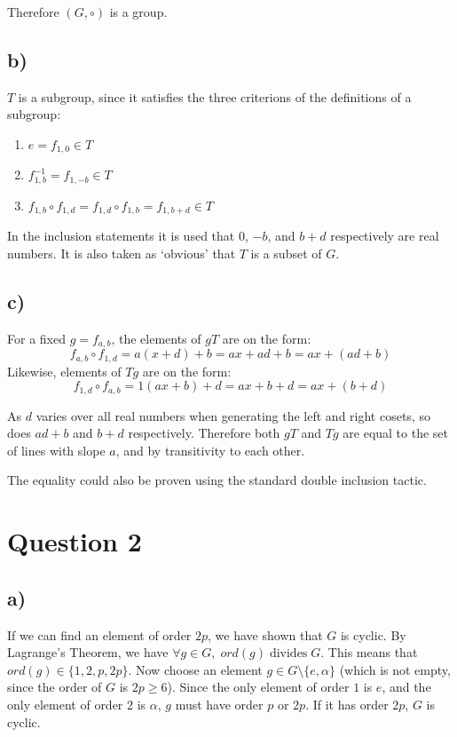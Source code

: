 \documentclass[a4paper,12pt]{article}
\begin{document}
Therefore $(G, \circ)$ is a group.

\subsection*{b)}

$T$ is a subgroup, since it satisfies the three criterions of the definitions of a subgroup:

\begin{enumerate}
    \item $e = f_{1, 0} \in T$
    \item $f_{1, b}^{-1} = f_{1, -b} \in T$
    \item $f_{1, b} \circ f_{1, d} = f_{1, d} \circ f_{1, b} = f_{1, b + d} \in T$
\end{enumerate}
In the inclusion statements it is used that $0$, $-b$, and $b + d$ respectively are real numbers. It is also taken as `obvious' that $T$ is a subset of $G$.

\subsection*{c)}
For a fixed $g = f_{a, b}$, the elements of $gT$ are on the form:
$$
f_{a, b} \circ f_{1, d} = a(x + d) + b = ax + ad + b = ax + (ad + b)
$$
Likewise, elements of $Tg$ are on the form:
$$
f_{1, d} \circ f_{a, b} = 1(ax + b) + d = ax + b + d = ax + (b + d)
$$

As $d$ varies over all real numbers when generating the left and right cosets, so does $ad + b$ and $b + d$ respectively. Therefore both $gT$ and $Tg$ are equal to the set of lines with slope $a$, and by transitivity to each other.

The equality could also be proven using the standard double inclusion tactic.

\clearpage
\section*{Question 2}


\subsection*{a)}

If we can find an element of order $2p$, we have shown that $G$ is cyclic. By Lagrange's Theorem, we have $\forall g \in G, \; ord(g) \; \text{divides} \; G$. This means that $ord(g) \in \{1, 2, p, 2p\}$. Now choose an element $g \in G \setminus \{e, \alpha \}$ (which is not empty, since the order of $G$ is $2p \geq 6$). Since the only element of order $1$ is $e$, and the only element of order $2$ is $\alpha$, $g$ must have order $p$ or $2p$. If it has order $2p$, $G$ is cyclic.
\end{document}

